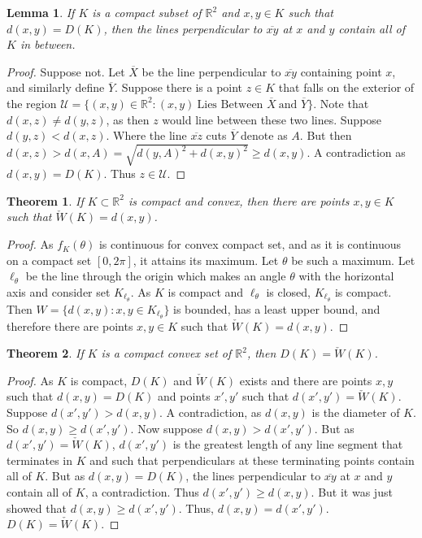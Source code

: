 \documentclass[12pt,oneside]{book}
\theoremstyle{mystyle}
\newtheorem{theorem}{Theorem}[section]
\newtheorem{lemma}{Lemma}[section]
\begin{document}
\begin{lemma}
If $K$ is a compact subset of $\mathbb{R}^2$ and $x,y\in K$ such that $d(x,y)=D(K)$, then the lines perpendicular to $\overline{xy}$ at $x$ and $y$ contain all of $K$ in between.
\end{lemma}
\begin{proof}
Suppose not. Let $\overline{X}$ be the line perpendicular to $\overline{xy}$ containing point $x$, and similarly define $\overline{Y}$. Suppose there is a point $z\in K$ that falls on the exterior of the region $\mathcal{U} = \{(x,y)\in \mathbb{R}^2: (x,y)\ \textrm{Lies Between } \overline{X}\ \textrm{and } \overline{Y}\}$. Note that $d(x,z)\ne d(y,z)$, as then $z$ would line between these two lines. Suppose $d(y,z)<d(x,z)$. Where the line $\overline{xz}$ cuts $\overline{Y}$ denote as $A$. But then $d(x,z) > d(x,A) = \sqrt{d(y,A)^2+d(x,y)^2}\geq d(x,y)$. A contradiction as $d(x,y) = D(K)$. Thus $z\in \mathcal{U}$.
\end{proof}

\begin{theorem}
If $K\subset \mathbb{R}^2$ is compact and convex, then there are points $x,y\in K$ such that $\check{W}(K)=d(x,y)$.
\end{theorem}
\begin{proof}
As $f_K(\theta)$ is continuous for convex compact set, and as it is continuous on a compact set $[0,2\pi]$, it attains its maximum. Let $\theta$ be such a maximum. Let $\ell_{\theta}$ be the line through the origin which makes an angle $\theta$ with the horizontal axis and consider set $K_{\ell_{\theta}}$. As $K$ is compact and $\ell_{\theta}$ is closed, $K_{\ell_{\theta}}$ is compact. Then $W=\{d(x,y):x,y\in K_{\ell_{\theta}}\}$ is bounded, has a least upper bound, and therefore there are points $x,y \in K$ such that $\check{W}(K)=d(x,y)$.
\end{proof}

\begin{theorem}
If $K$ is a compact convex set of $\mathbb{R}^2$, then $D(K) = \check{W}(K)$.
\end{theorem}
\begin{proof}
As $K$ is compact, $D(K)$ and $\check{W}(K)$ exists and there are points $x,y$ such that $d(x,y) = D(K)$ and points $x',y'$ such that $d(x',y') = \check{W}(K)$. Suppose $d(x',y')> d(x,y)$. A contradiction, as $d(x,y)$ is the diameter of $K$. So $d(x,y) \geq d(x',y')$. Now suppose $d(x,y)>d(x',y')$. But as $d(x',y')= \check{W}(K)$, $d(x',y')$ is the greatest length of any line segment that terminates in $K$ and such that perpendiculars at these terminating points contain all of $K$. But as $d(x,y)=D(K)$, the lines perpendicular to $\overline{xy}$ at $x$ and $y$ contain all of $K$, a contradiction. Thus $d(x',y') \geq d(x,y)$. But it was just showed that $d(x,y)\geq d(x',y')$. Thus, $d(x,y) = d(x',y')$. $D(K) = \check{W}(K)$.
\end{proof}
\end{document}
